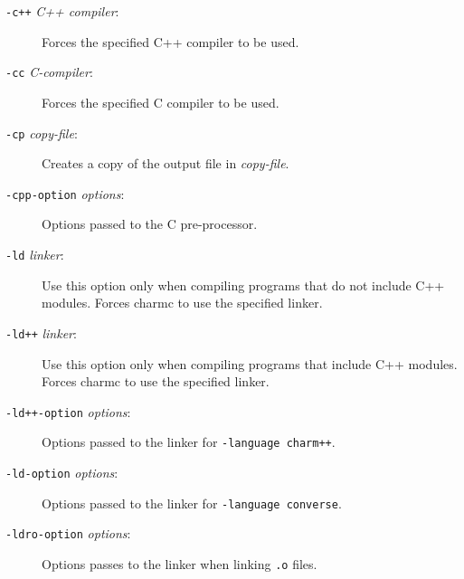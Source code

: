 \begin{description}
\item[{\tt -c++} {\em C++ compiler}:]

Forces the specified C++ compiler to be used.

\item[{\tt -cc} {\em C-compiler}:]

Forces the specified C compiler to be used.

\item[{\tt -cp} {\em copy-file}:]

Creates a copy of the output file in {\em copy-file}.

\item[{\tt -cpp-option} {\em options}:]

Options passed to the C pre-processor.

\item[{\tt -ld} {\em linker}:]

Use this option only when compiling programs that do not include C++
modules.  Forces charmc to use the specified linker.

\item[{\tt -ld++} {\em linker}:]

Use this option only when compiling programs that include C++
modules.  Forces charmc to use the specified linker.

\item[{\tt -ld++-option} {\em options}:]

Options passed to the linker for {\tt -language charm++}.

\item[{\tt -ld-option} {\em options}:]

Options passed to the linker for {\tt -language converse}.

\item[{\tt -ldro-option} {\em options}:]

Options passes to the linker when linking {\tt .o} files.


\end{description}
